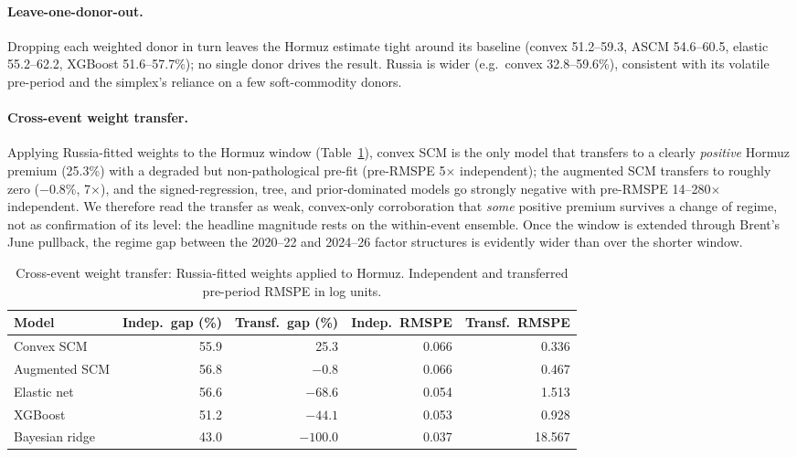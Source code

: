\documentclass[11pt,a4paper]{article}
\begin{document}
\paragraph{Leave-one-donor-out.} Dropping each weighted donor in turn leaves the Hormuz
estimate tight around its baseline (convex 51.2--59.3, ASCM 54.6--60.5, elastic 55.2--62.2,
XGBoost 51.6--57.7\%); no single donor drives the result. Russia is wider (e.g.\ convex
32.8--59.6\%), consistent with its volatile pre-period and the simplex's reliance on a few
soft-commodity donors.

\paragraph{Cross-event weight transfer.} Applying Russia-fitted weights to the Hormuz
window (Table~\ref{tab:transfer}), convex SCM is the only model that transfers to a clearly
\emph{positive} Hormuz premium (25.3\%) with a degraded but non-pathological pre-fit
(pre-RMSPE 5$\times$ independent); the augmented SCM transfers to roughly zero ($-0.8$\%,
7$\times$), and the signed-regression, tree, and prior-dominated models go strongly negative
with pre-RMSPE 14--280$\times$ independent. We therefore read the transfer as weak,
convex-only corroboration that \emph{some} positive premium survives a change of regime,
not as confirmation of its level: the headline magnitude rests on the within-event ensemble.
Once the window is extended through Brent's June pullback, the regime gap between the
2020--22 and 2024--26 factor structures is evidently wider than over the shorter window.

\begin{table}[h]
\centering
\caption{Cross-event weight transfer: Russia-fitted weights applied to Hormuz. Independent
and transferred pre-period RMSPE in log units.}
\label{tab:transfer}
\small
\begin{tabular}{@{}lrrrr@{}}
\toprule
Model & Indep.\ gap (\%) & Transf.\ gap (\%) & Indep.\ RMSPE & Transf.\ RMSPE \\
\midrule
Convex SCM     & 55.9 & 25.3   & 0.066 & 0.336 \\
Augmented SCM  & 56.8 & $-0.8$  & 0.066 & 0.467 \\
Elastic net    & 56.6 & $-68.6$ & 0.054 & 1.513 \\
XGBoost        & 51.2 & $-44.1$ & 0.053 & 0.928 \\
Bayesian ridge & 43.0 & $-100.0$ & 0.037 & 18.567 \\
\bottomrule
\end{tabular}
\end{table}
\end{document}
